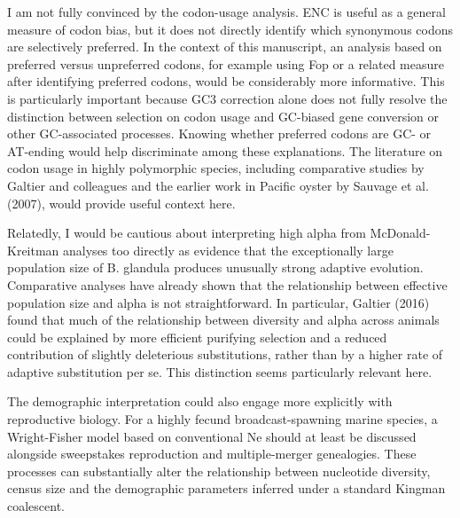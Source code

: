 \begin{point}{} %
I am not fully convinced by the codon-usage analysis. ENC is useful as a
general measure of codon bias, but it does not directly identify which
synonymous codons are selectively preferred. In the context of this
manuscript, an analysis based on preferred versus unpreferred codons, for
example using Fop or a related measure after identifying preferred
codons, would be considerably more informative. This is particularly
important because GC3 correction alone does not fully resolve the
distinction between selection on codon usage and GC-biased gene
conversion or other GC-associated processes. Knowing whether preferred
codons are GC- or AT-ending would help discriminate among these
explanations. The literature on codon usage in highly polymorphic
species, including comparative studies by Galtier and colleagues and the
earlier work in Pacific oyster by Sauvage et al. (2007), would provide
useful context here.
\end{point}


\begin{point}{} %
Relatedly, I would be cautious about interpreting high alpha from
McDonald-Kreitman analyses too directly as evidence that the
exceptionally large population size of B. glandula produces unusually
strong adaptive evolution. Comparative analyses have already shown that
the relationship between effective population size and alpha is not
straightforward. In particular, Galtier (2016) found that much of the
relationship between diversity and alpha across animals could be
explained by more efficient purifying selection and a reduced
contribution of slightly deleterious substitutions, rather than by a
higher rate of adaptive substitution per se. This distinction seems
particularly relevant here.
\end{point}


\begin{point}{} %
The demographic interpretation could also engage more explicitly with
reproductive biology. For a highly fecund broadcast-spawning marine
species, a Wright-Fisher model based on conventional Ne should at least
be discussed alongside sweepstakes reproduction and multiple-merger
genealogies. These processes can substantially alter the relationship
between nucleotide diversity, census size and the demographic parameters
inferred under a standard Kingman coalescent.
\end{point}

